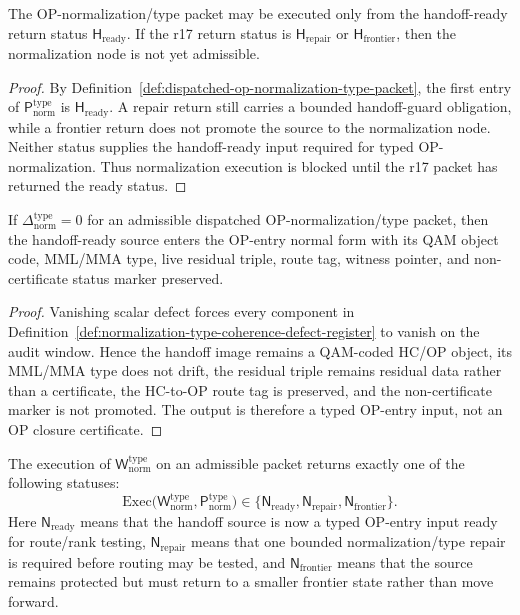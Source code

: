 \begin{lemma}
\label{lem:handoff-ready-return-is-normalization-precondition}
The OP-normalization/type packet may be executed only from the handoff-ready return status \(\mathsf H_{\mathrm{ready}}\).  If the r17 return status is \(\mathsf H_{\mathrm{repair}}\) or \(\mathsf H_{\mathrm{frontier}}\), then the normalization node is not yet admissible.
\end{lemma}

\begin{proof}
By Definition~\ref{def:dispatched-op-normalization-type-packet}, the first entry of \(\mathsf P_{\mathrm{norm}}^{\mathrm{type}}\) is \(\mathsf H_{\mathrm{ready}}\).  A repair return still carries a bounded handoff-guard obligation, while a frontier return does not promote the source to the normalization node.  Neither status supplies the handoff-ready input required for typed OP-normalization.  Thus normalization execution is blocked until the r17 packet has returned the ready status.
\end{proof}

\begin{lemma}
\label{lem:zero-normalization-type-defect-preserves-op-entry-data}
If \(\Delta_{\mathrm{norm}}^{\mathrm{type}}=0\) for an admissible dispatched OP-normalization/type packet, then the handoff-ready source enters the OP-entry normal form with its QAM object code, MML/MMA type, live residual triple, route tag, witness pointer, and non-certificate status marker preserved.
\end{lemma}

\begin{proof}
Vanishing scalar defect forces every component in Definition~\ref{def:normalization-type-coherence-defect-register} to vanish on the audit window.  Hence the handoff image remains a QAM-coded HC/OP object, its MML/MMA type does not drift, the residual triple remains residual data rather than a certificate, the HC-to-OP route tag is preserved, and the non-certificate marker is not promoted.  The output is therefore a typed OP-entry input, not an OP closure certificate.
\end{proof}

\begin{definition}
\label{def:r18-op-normalization-type-return}
The execution of \(\mathsf W_{\mathrm{norm}}^{\mathrm{type}}\) on an admissible packet returns exactly one of the following statuses:
\[
\mathrm{Exec}\bigl(\mathsf W_{\mathrm{norm}}^{\mathrm{type}},
                   \mathsf P_{\mathrm{norm}}^{\mathrm{type}}\bigr)
\in
\{\mathsf N_{\mathrm{ready}},\mathsf N_{\mathrm{repair}},\mathsf N_{\mathrm{frontier}}\}.
\]
Here \(\mathsf N_{\mathrm{ready}}\) means that the handoff source is now a typed OP-entry input ready for route/rank testing, \(\mathsf N_{\mathrm{repair}}\) means that one bounded normalization/type repair is required before routing may be tested, and \(\mathsf N_{\mathrm{frontier}}\) means that the source remains protected but must return to a smaller frontier state rather than move forward.
\end{definition}

